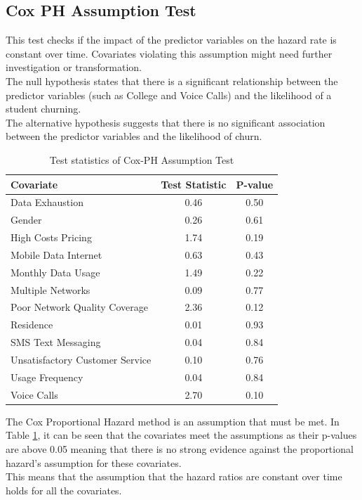 \documentclass[doublespacing,12pt]{report}
\begin{document}
{\subsection{Cox PH Assumption Test}
\normalsize{\noindent This test checks if the impact of the predictor variables on the hazard rate is constant over time. Covariates violating this assumption might need further investigation or transformation.\\	
The null hypothesis states that there is a significant relationship between the predictor variables (such as College and Voice Calls) and the likelihood of a student churning.\\
The alternative hypothesis suggests that there is no significant association between the predictor variables and the likelihood of churn.}

\begin{table}[H]
    \centering
    \begin{tabular}{lcc}
        \toprule
        Covariate & Test Statistic & P-value \\
        \midrule
        Data Exhaustion & 0.46 & 0.50 \\
        Gender & 0.26 & 0.61 \\
        High Costs Pricing & 1.74 & 0.19 \\
        Mobile Data Internet & 0.63 & 0.43 \\
        Monthly Data Usage & 1.49 & 0.22 \\
        Multiple Networks & 0.09 & 0.77 \\
        Poor Network Quality Coverage & 2.36 & 0.12 \\
        Residence & 0.01 & 0.93 \\
        SMS Text Messaging & 0.04 & 0.84 \\
        Unsatisfactory Customer Service & 0.10 & 0.76 \\
        Usage Frequency & 0.04 & 0.84 \\
        Voice Calls & 2.70 & 0.10 \\
        \bottomrule
    \end{tabular}
    \caption{Test statistics of Cox-PH Assumption Test}
    \label{tab:test_statistics}
\end{table}


\normalsize{\noindent The Cox Proportional Hazard method is an assumption that must be met. In Table \ref{tab:test_statistics}, it can be seen that the covariates meet the assumptions as their p-values are above 0.05 meaning that there is no strong evidence against the proportional hazard’s assumption for these covariates.\\
This means that the assumption that the hazard ratios are constant over time holds for all the covariates.}



}
\end{document}
